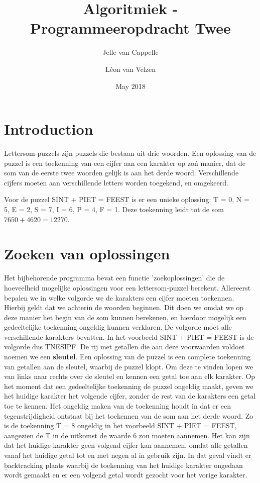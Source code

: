 \documentclass{article}
\title{Algoritmiek - Programmeeropdracht Twee}
\author{Jelle van Cappelle \and L\'eon van Velzen}
\date{May 2018}
\begin{document}
\maketitle

\section{Introduction}

Lettersom-puzzels zijn puzzels die bestaan uit drie woorden. Een oplossing van de puzzel is een toekenning van een cijfer aan een karakter op zo\'n manier, dat de som van de eerste twee woorden gelijk is aan het derde woord. Verschillende cijfers moeten aan verschillende letters worden toegekend, en omgekeerd.

Voor de puzzel SINT + PIET = FEEST is er een unieke oplossing: T = 0, N = 5, E = 2, S = 7, I = 6, P = 4, F = 1. Deze toekenning leidt tot de som $7650 + 4620 = 12270$.

\section{Zoeken van oplossingen}

Het bijbehorende programma bevat een functie 'zoekoplossingen' die de hoeveelheid mogelijke oplossingen voor een lettersom-puzzel berekent. Allereerst bepalen we in welke volgorde we de karakters een cijfer moeten toekennen. Hierbij geldt dat we achterin de woorden beginnen. Dit doen we omdat we op deze manier het begin van de som kunnen berekenen, en hierdoor mogelijk een gedeeltelijke toekenning ongeldig kunnen verklaren. De volgorde moet alle verschillende karakters bevatten. In het voorbeeld SINT + PIET = FEEST is de volgorde dus TNESIPF. De rij met getallen die aan deze voorwaarden voldoet noemen we een \textbf{sleutel}. Een oplossing van de puzzel is een complete toekenning van getallen aan de sleutel, waarbij de puzzel klopt. Om deze te vinden lopen we van links naar rechts over de sleutel en kennen een getal toe aan elk karakter. Op het moment dat een gedeeltelijke toekenning de puzzel ongeldig maakt, geven we het huidige karakter het volgende cijfer, zonder de rest van de karakters een getal toe te kennen. Het ongeldig maken van de toekenning houdt in dat er een tegenstrijdigheid ontstaat bij het toekennen van de som aan het derde woord. Zo is de toekenning T = 8 ongeldig in het voorbeeld SINT + PIET = FEEST, aangezien de T in de uitkomst de waarde 6 zou moeten aannemen. Het kan zijn dat het huidige karakter geen volgend cijfer kan aannemen, omdat alle getallen vanaf het huidige getal tot en met negen al in gebruik zijn. In dat geval vindt er \b{backtracking} plaats waarbij de toekenning van het huidige karakter ongedaan wordt gemaakt en er een volgend getal wordt gezocht voor het vorige karakter.
\end{document}
